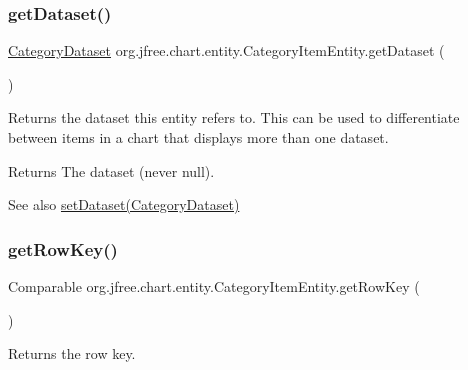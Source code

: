 \subsubsection{\texorpdfstring{get\+Dataset()}{getDataset()}}
{\footnotesize\ttfamily \mbox{\hyperlink{interfaceorg_1_1jfree_1_1data_1_1category_1_1_category_dataset}{Category\+Dataset}} org.\+jfree.\+chart.\+entity.\+Category\+Item\+Entity.\+get\+Dataset (\begin{DoxyParamCaption}{ }\end{DoxyParamCaption})}

Returns the dataset this entity refers to. This can be used to differentiate between items in a chart that displays more than one dataset.

\begin{DoxyReturn}{Returns}
The dataset (never {\ttfamily null}).
\end{DoxyReturn}
\begin{DoxySeeAlso}{See also}
\mbox{\hyperlink{classorg_1_1jfree_1_1chart_1_1entity_1_1_category_item_entity_aded36783035f03d00b1c0b8625b0a7bd}{set\+Dataset(\+Category\+Dataset)}} 
\end{DoxySeeAlso}
\mbox{\label{classorg_1_1jfree_1_1chart_1_1entity_1_1_category_item_entity_a8d21cdafb1a07e935df8df6d20369814}} 
\subsubsection{\texorpdfstring{get\+Row\+Key()}{getRowKey()}}
{\footnotesize\ttfamily Comparable org.\+jfree.\+chart.\+entity.\+Category\+Item\+Entity.\+get\+Row\+Key (\begin{DoxyParamCaption}{ }\end{DoxyParamCaption})}

Returns the row key.

